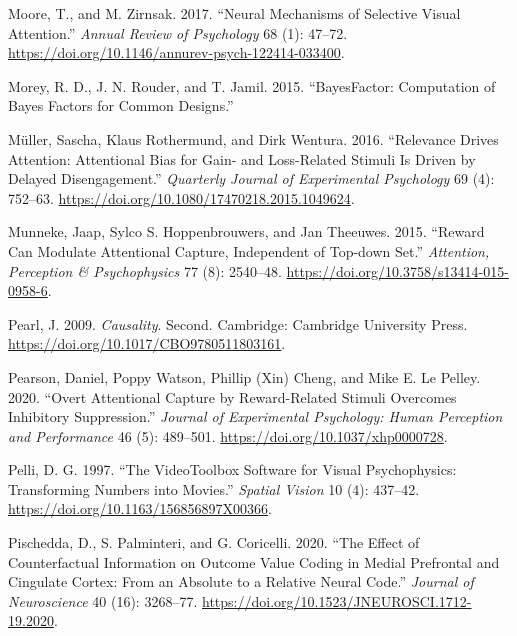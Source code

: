 \documentclass[11pt,halfline,a4paper,]{ouparticle}
\newlength{\cslhangindent}
\newlength{\cslentryspacingunit} %
\newenvironment{CSLReferences}[2] %
 {%
  \setlength{\parindent}{0pt}
  \ifodd #1
  \let\oldpar\par
  \def\par{\hangindent=\cslhangindent\oldpar}
  \fi
  \setlength{\parskip}{#2\cslentryspacingunit}
 }%
 {}
\begin{document}
\begin{CSLReferences}{1}{0}
\leavevmode{}%
Moore, T., and M. Zirnsak. 2017. {``Neural {Mechanisms} of {Selective Visual Attention}.''} \emph{Annual Review of Psychology} 68 (1): 47--72. \url{https://doi.org/10.1146/annurev-psych-122414-033400}.

\leavevmode{}%
Morey, R. D., J. N. Rouder, and T. Jamil. 2015. {``{BayesFactor}: {Computation} of {Bayes Factors} for {Common Designs}.''}

\leavevmode{}%
Müller, Sascha, Klaus Rothermund, and Dirk Wentura. 2016. {``Relevance Drives Attention: {Attentional} Bias for Gain- and Loss-Related Stimuli Is Driven by Delayed Disengagement.''} \emph{Quarterly Journal of Experimental Psychology} 69 (4): 752--63. \url{https://doi.org/10.1080/17470218.2015.1049624}.

\leavevmode{}%
Munneke, Jaap, Sylco S. Hoppenbrouwers, and Jan Theeuwes. 2015. {``Reward Can Modulate Attentional Capture, Independent of Top-down Set.''} \emph{Attention, Perception \& Psychophysics} 77 (8): 2540--48. \url{https://doi.org/10.3758/s13414-015-0958-6}.

\leavevmode{}%
Pearl, J. 2009. \emph{Causality}. Second. {Cambridge}: {Cambridge University Press}. \url{https://doi.org/10.1017/CBO9780511803161}.

\leavevmode{}%
Pearson, Daniel, Poppy Watson, Phillip (Xin) Cheng, and Mike E. Le Pelley. 2020. {``Overt Attentional Capture by Reward-Related Stimuli Overcomes Inhibitory Suppression.''} \emph{Journal of Experimental Psychology: Human Perception and Performance} 46 (5): 489--501. \url{https://doi.org/10.1037/xhp0000728}.

\leavevmode{}%
Pelli, D. G. 1997. {``The {VideoToolbox} Software for Visual Psychophysics: Transforming Numbers into Movies.''} \emph{Spatial Vision} 10 (4): 437--42. \url{https://doi.org/10.1163/156856897X00366}.

\leavevmode{}%
Pischedda, D., S. Palminteri, and G. Coricelli. 2020. {``The {Effect} of {Counterfactual Information} on {Outcome Value Coding} in {Medial Prefrontal} and {Cingulate Cortex}: {From} an {Absolute} to a {Relative Neural Code}.''} \emph{Journal of Neuroscience} 40 (16): 3268--77. \url{https://doi.org/10.1523/JNEUROSCI.1712-19.2020}.


\end{CSLReferences}
\end{document}
